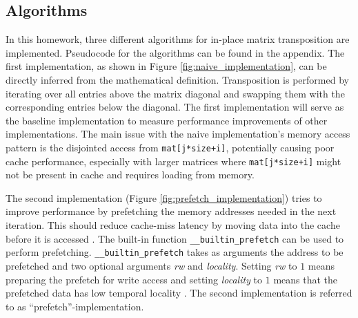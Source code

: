 \documentclass{scrartcl}
\begin{document}
    \subsection{Algorithms}
    In this homework, three different algorithms for in-place matrix transposition are implemented. Pseudocode for the algorithms can be found in the appendix. The first implementation, as shown in Figure \ref{fig:naive_implementation}, can be directly inferred from the mathematical definition. Transposition is performed by iterating over all entries above the matrix diagonal and swapping them with the corresponding entries below the diagonal. The first implementation will serve as the baseline implementation to measure performance improvements of other implementations. 
    The main issue with the naive implementation's memory access pattern is the disjointed access from \lstinline{mat[j*size+i]}, potentially causing poor cache performance, especially with larger matrices where \lstinline{mat[j*size+i]} might not be present in cache and requires loading from memory.

    The second implementation (Figure \ref{fig:prefetch_implementation}) tries to improve performance by prefetching the memory addresses needed in the next iteration. This should reduce cache-miss latency by moving data into the cache before it is accessed \cite{gccdocs}. The built-in function \lstinline{__builtin_prefetch} can be used to perform prefetching. \lstinline{__builtin_prefetch} takes as arguments the address to be prefetched and two optional arguments \textit{rw} and \textit{locality}. Setting \textit{rw} to $1$ means preparing the prefetch for write access and setting \textit{locality} to $1$ means that the prefetched data has low temporal locality \cite{gccdocs}. The second implementation is referred to as ``prefetch''-implementation.
\end{document}
